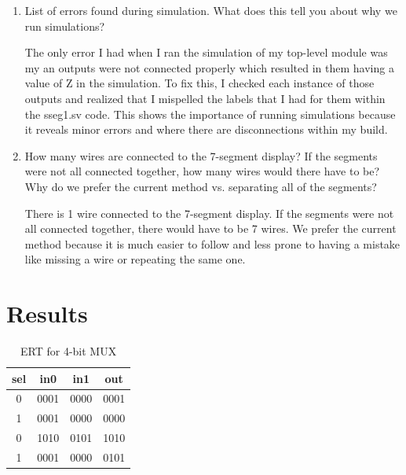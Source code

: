 \documentclass[11pt]{article}
\begin{document}
\begin{enumerate}
	\item List of errors found during simulation. What does this tell you about why we run simulations?
	
	The only error I had when I ran the simulation of my top-level module was my an outputs were not connected properly which resulted in them having a value of Z in the simulation. To fix this, I checked each instance of those outputs and realized that I mispelled the labels that I had for them within the sseg1.sv code.
	This shows the importance of running simulations because it reveals minor errors and where there are disconnections within my build.
	
	\item How many wires are connected to the 7-segment display? If the segments were not all connected together, how many wires would there have to be? Why do we prefer the current method vs. separating all of the segments?
	
	There is 1 wire connected to the 7-segment display. If the segments were not all connected together, there would have to be 7 wires. We prefer the current method because it is much easier to follow and less prone to having a mistake like missing a wire or repeating the same one.
	
\end{enumerate}


\section*{Results}

\begin{table}[ht]\centering
	\caption{ERT for 4-bit MUX}
	\label{tbl:example_table}
	\begin{tabular}{ccc|c}
		\toprule
		sel & in0 & in1 & out \\
		\midrule
		0 & 0001 & 0000 & 0001 \\
		1 & 0001 & 0000 & 0000 \\
		0 & 1010 & 0101 & 1010 \\
		1 & 0001 & 0000 & 0101 \\
		\bottomrule
	\end{tabular} 
\end{table}
\end{document}
